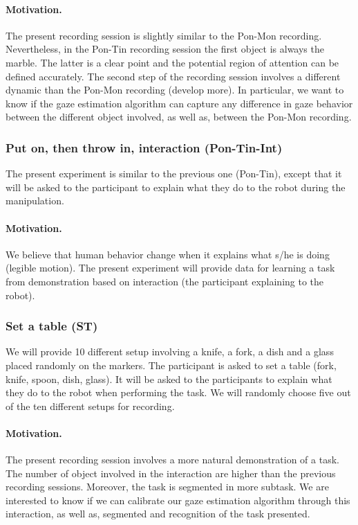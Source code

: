 \documentclass[11pt,a4paper]{article}
\begin{document}
\paragraph{Motivation.} The present recording session is slightly similar to the Pon-Mon recording. Nevertheless, in the Pon-Tin recording session the first object is always the marble. The latter is a clear point and the potential region of attention can be defined accurately. The second step of the recording session involves a different dynamic than the Pon-Mon recording (develop more). In particular, we want to know if the gaze estimation algorithm can capture any difference in gaze behavior between the different object involved, as well as, between the Pon-Mon recording.

\subsubsection{Put on, then throw in, interaction (Pon-Tin-Int)}
The present experiment is similar to the previous one (Pon-Tin), except that it will be asked to the participant to explain what they do to the robot during the manipulation.
\paragraph{Motivation.}
We believe that human behavior change when it explains what s/he is doing (legible motion). The present experiment will provide data for learning a task from demonstration based on interaction (the participant explaining to the robot).

\subsubsection{Set a table (ST)}
We will provide 10 different setup involving a knife, a fork, a dish and a glass placed randomly on the markers. The participant is asked to set a table (fork, knife, spoon, dish, glass). It will be asked to the participants to explain what they do to the robot when performing the task. We will randomly choose five out of the ten different setups for recording.
\paragraph{Motivation.}
The present recording session involves a more natural demonstration of a task. The number of object involved in the interaction are higher than the previous recording sessions. Moreover, the task is segmented in more subtask. We are interested to know if we can calibrate our gaze estimation algorithm through this interaction, as well as, segmented and recognition of the task presented.
\end{document}
